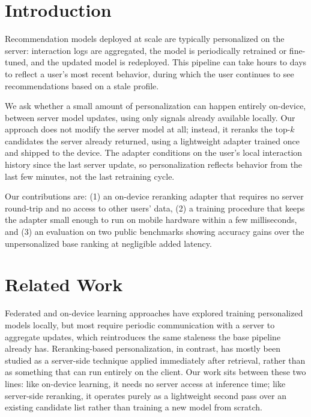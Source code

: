 \documentclass[sigconf]{acmart}
\begin{document}
\maketitle

\section{Introduction}
Recommendation models deployed at scale are typically personalized on the server: interaction logs are aggregated, the model is periodically retrained or fine-tuned, and the updated model is redeployed. This pipeline can take hours to days to reflect a user's most recent behavior, during which the user continues to see recommendations based on a stale profile.

We ask whether a small amount of personalization can happen entirely on-device, between server model updates, using only signals already available locally. Our approach does not modify the server model at all; instead, it reranks the top-$k$ candidates the server already returned, using a lightweight adapter trained once and shipped to the device. The adapter conditions on the user's local interaction history since the last server update, so personalization reflects behavior from the last few minutes, not the last retraining cycle.

Our contributions are: (1) an on-device reranking adapter that requires no server round-trip and no access to other users' data, (2) a training procedure that keeps the adapter small enough to run on mobile hardware within a few milliseconds, and (3) an evaluation on two public benchmarks showing accuracy gains over the unpersonalized base ranking at negligible added latency.

\section{Related Work}
Federated and on-device learning approaches have explored training personalized models locally, but most require periodic communication with a server to aggregate updates, which reintroduces the same staleness the base pipeline already has. Reranking-based personalization, in contrast, has mostly been studied as a server-side technique applied immediately after retrieval, rather than as something that can run entirely on the client. Our work sits between these two lines: like on-device learning, it needs no server access at inference time; like server-side reranking, it operates purely as a lightweight second pass over an existing candidate list rather than training a new model from scratch.
\end{document}
